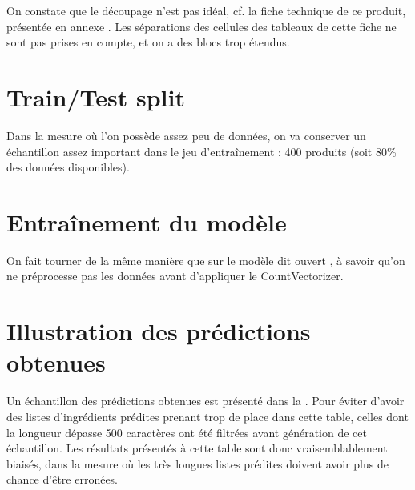         \begin{multicols}{3}
        \begin{spacing}{1.0}
        \label{blocks_examples}
        {\tiny
        
        }
        \end{spacing}
        \end{multicols}

        On constate que le découpage n'est pas idéal, cf. la fiche technique de ce produit, présentée en annexe .
        Les séparations des cellules des tableaux de cette fiche ne sont pas prises en compte, et on a des blocs trop étendus.

        \section{Train/Test split}

        Dans la mesure où l'on possède assez peu de données, on va conserver un échantillon assez important dans le jeu d'entraînement : 400 produits (soit 80\% des données disponibles).

        \section{Entraînement du modèle}

        On fait tourner de la même manière que sur le modèle dit \og ouvert \fg, à savoir qu'on ne préprocesse pas les données avant d'appliquer le CountVectorizer.

        \section{Illustration des prédictions obtenues}
        \label{prediction_gt_illustration}
        Un échantillon des prédictions obtenues est présenté dans la .
        Pour éviter d'avoir des listes d'ingrédients prédites prenant trop de place dans cette table, celles dont la longueur dépasse 500 caractères ont été filtrées avant génération de cet échantillon.
        Les résultats présentés à cette table sont donc vraisemblablement biaisés, dans la mesure où les très longues listes prédites doivent avoir plus de chance d'être erronées.

